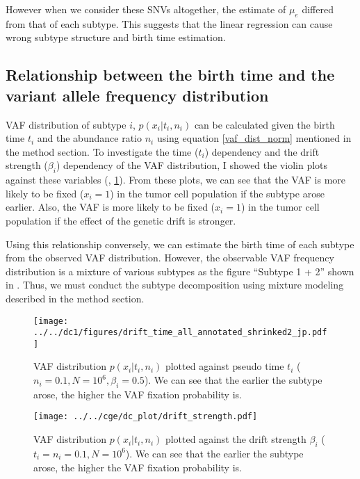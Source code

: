 \documentclass{article}
\begin{document}
However when we consider these SNVs altogether, the estimate of $\mu_e$ differed from that of each subtype. This suggests that the linear regression can cause wrong subtype structure and birth time estimation.

\subsection{Relationship between the birth time and the variant allele frequency distribution}
VAF distribution of subtype $i$, $p(x_i | t_i, n_i)$ can be calculated given the birth time $t_i$ and the abundance ratio $n_i$ using equation \eqref{vaf_dist_norm} mentioned in the method section. To investigate the time ($t_i$) dependency and the drift strength ($\beta_i$) dependency of the VAF distribution, I showed the violin plots against these variables (, \ref{vaf_against_strength}). From these plots, we can see that the VAF is more likely to be fixed ($x_i = 1$) in the tumor cell population if the subtype arose earlier. Also, the VAF is more likely to be fixed ($x_i = 1$) in the tumor cell population if the effect of the genetic drift is stronger.

Using this relationship conversely, we can estimate the birth time of each subtype from the observed VAF distribution.
However, the observable VAF frequency distribution is a mixture of various subtypes as the figure ``Subtype 1 + 2'' shown in .
Thus, we must conduct the subtype decomposition using mixture modeling described in the method section.

\begin{figure}[H]
 \begin{minipage}[c]{0.47\hsize}
 \begin{center}
  \texttt{[image: ../../dc1/figures/drift\_time\_all\_annotated\_shrinked2\_jp.pdf]}
 \end{center}
    \caption{
  VAF distribution $p(x_i | t_i, n_i)$ plotted against pseudo time $t_i$ ($n_i=0.1, N=10^6, \beta_i=0.5$).
  We can see that the earlier the subtype arose, the higher the VAF fixation probability is.
  }
    \label{fig: vaf_against_time}
\end{minipage}
 \hspace{1truecm}
\begin{minipage}[c]{0.47\hsize}
 \begin{center}
\texttt{[image: ../../cge/dc\_plot/drift\_strength.pdf]}
 \end{center}
   \caption{
 VAF distribution $p(x_i | t_i, n_i)$ plotted against the drift strength $\beta_i$ ($t_i= n_i=0.1, N=10^6$).
 We can see that the earlier the subtype arose, the higher the VAF fixation probability is.
  }
   \label{vaf_against_strength}
\end{minipage}
\end{figure}
\end{document}

